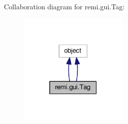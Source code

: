 Collaboration diagram for remi.\+gui.\+Tag\+:
\nopagebreak
\begin{figure}[H]
\begin{center}
\leavevmode
\includegraphics[width=151pt]{db/d95/classremi_1_1gui_1_1Tag__coll__graph}
\end{center}
\end{figure}
